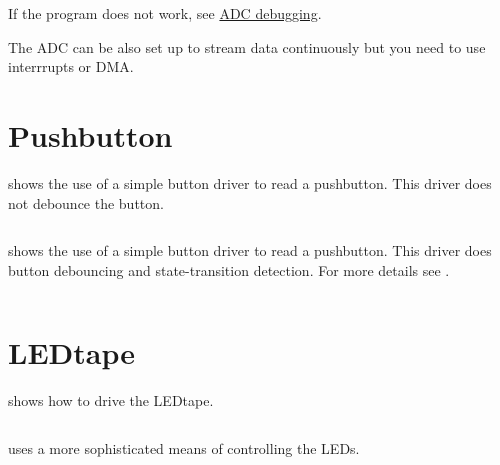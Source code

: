 If the program does not work, see  \hyperref[debugging-adc]{ADC debugging}.

The ADC can be also set up to stream data continuously but you need to
use interrrupts or DMA.


\section{Pushbutton}
\label{pushbutton}

 shows the use of a
simple button driver to read a pushbutton.  This driver does not debounce the button.

\inputminted{C}{../../src/test-apps/button_test1/button_test1.c}

 shows the use of a
simple button driver to read a pushbutton.  This driver does button
debouncing and state-transition detection.  For more details see
.

\inputminted{C}{../../src/test-apps/button_test2/button_test2.c}


\section{LEDtape}
\label{ledtape}

 shows how to drive the
LEDtape.

\inputminted{C}{../../src/test-apps/ledtape_test1/ledtape_test1.c}


 uses a more
sophisticated means of controlling the LEDs.

\inputminted{C}{../../src/test-apps/ledtape_test2/ledtape_test2.c}
